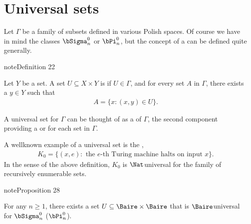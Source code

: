 \documentclass[letterpaper,10pt,english]{jupyterBook}
\begin{document}
\section{Universal sets}
\label{\detokenize{structureBorel:universal-sets}}
\sphinxAtStartPar
Let \(\Gamma\) be a family of subsets defined in various Polish spaces. Of course we have in mind the classes \(\bSigma^0_n\) or \(\bPi^0_n\), but the concept of a  can be defined quite generally.
\label{structureBorel:def-universal}
\begin{sphinxadmonition}{note}{Definition 22}



\sphinxAtStartPar
Let \(Y\) be a set. A set \(U \subseteq X \times Y\) is  if \(U \in \Gamma\), and for every set \(A\) in \(\Gamma\), there exists a \(y \in Y\) such that
\begin{equation*}
\begin{split}
    A = \{ x \colon (x,y) \in U \}.
\end{split}
\end{equation*}\end{sphinxadmonition}

\sphinxAtStartPar
A universal set for \(\Gamma\) can be thought of as a  of \(\Gamma\), the second component providing a  or  for each set in \(\Gamma\).

\sphinxAtStartPar
A well\sphinxhyphen{}known example of a universal set is the ,
\begin{equation*}
\begin{split}
	K_0 = \{ (x,e) \colon \text{ the $e$-th Turing machine halts on input $x$} \}.
\end{split}
\end{equation*}
\sphinxAtStartPar
In the sense of the above definition, \(K_0\) is \(\Nat\)\sphinxhyphen{}universal for the family of recursively enumerable sets.
\label{structureBorel:prop-Borel-universal}
\begin{sphinxadmonition}{note}{Proposition 28}



\sphinxAtStartPar
For any \(n \geq 1\), there exists a set \(U \subseteq \Baire \times \Baire\) that is \(\Baire\)\sphinxhyphen{}universal for \(\bSigma^0_n\) (\(\bPi^0_n\)).
\end{sphinxadmonition}
\end{document}

